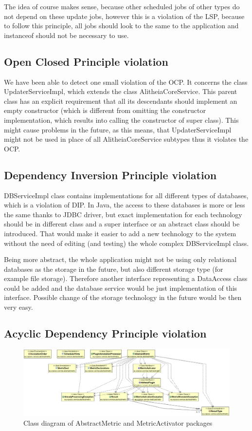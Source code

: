 \documentclass[a4paper,11pt,titlepage]{article}
\begin{document}
The idea of course makes sense, because other scheduled jobs of other types do not depend on these update jobs, however this is a violation of the LSP, because to follow this principle, all jobs should look to the same to the application and instanceof should not be necessary to use.

\subsection{Open Closed Principle violation}
We have been able to detect one small violation of the OCP. It concerns the class UpdaterServiceImpl, which extends the class AlitheiaCoreService. This parent class has an explicit requirement that all its descendants should implement an empty constructor (which is different from omitting the constructor implementation, which results into calling the constructor of super class). This might cause problems in the future, as this means, that UpdaterServiceImpl might not be used in place of all AlitheiaCoreService subtypes thus it violates the OCP.

\subsection{Dependency Inversion Principle violation}
DBServiceImpl class contains implementations for all different types of databases, which is a violation of DIP. In Java, the access to these databases is more or less the same thanks to JDBC driver, but exact implementation for each technology should be in different class and a super interface or an abstract class should be introduced. That would make it easier to add a new technology to the system without the need of editing (and testing) the whole complex DBServiceImpl class.

Being more abstract, the whole application might not be using only relational databases as the storage in the future, but also different storage type (for example file storage). Therefore another interface representing a DataAccess class could be added and the database service would be just implementation of this interface. Possible change of the storage technology in the future would be then very easy.

\subsection{Acyclic Dependency Principle violation}

\begin{figure}
\includegraphics[scale=0.3]{class_cyclic_dependency}
\centering
\caption{Class diagram of AbstractMetric and MetricActivator packages}
\label{fig:classmetrics}
\end{figure}
\end{document}
